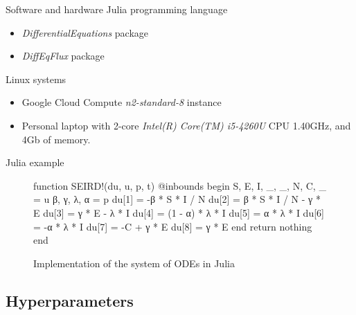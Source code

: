 \begin{frame}{Software and hardware}
    Julia programming language
    \begin{itemize}
        \item \textit{DifferentialEquations} package
        \item \textit{DiffEqFlux} package
    \end{itemize}

    Linux systems
    \begin{itemize}
        \item Google Cloud Compute \textit{n2-standard-8} instance
        \item Personal laptop with 2-core \textit{Intel(R) Core(TM) i5-4260U} CPU 1.40GHz, and 4Gb of memory.
    \end{itemize}
\end{frame}

\begin{frame}[fragile]{Julia example}
\begin{figure}[!htb]
\centering
\begin{jllisting}
function SEIRD!(du, u, p, t)
    @inbounds begin
        S, E, I, _, _, N, C, _ = u
        β, γ, λ, α = p
        du[1] = -β * S * I / N
        du[2] = β * S * I / N - γ * E
        du[3] = γ * E - λ * I
        du[4] = (1 - α) * λ * I
        du[5] = α * λ * I
        du[6] = -α * λ * I
        du[7] = -C + γ * E
        du[8] = γ * E
    end
    return nothing
end
\end{jllisting}
\caption{Implementation of the system of ODEs in Julia}
\label{fig:diffeq-seird-inplace}
\end{figure}
\end{frame}

\subsection{Hyperparameters}

